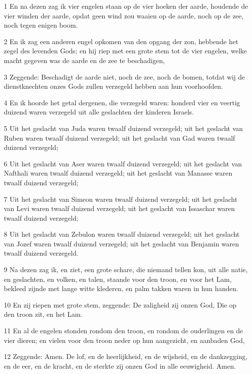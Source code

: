 \par 1 En na dezen zag ik vier engelen staan op de vier hoeken der aarde, houdende de vier winden der aarde, opdat geen wind zou waaien op de aarde, noch op de zee, noch tegen enigen boom.
\par 2 En ik zag een anderen engel opkomen van den opgang der zon, hebbende het zegel des levenden Gods; en hij riep met een grote stem tot de vier engelen, welke macht gegeven was de aarde en de zee te beschadigen,
\par 3 Zeggende: Beschadigt de aarde niet, noch de zee, noch de bomen, totdat wij de dienstknechten onzes Gods zullen verzegeld hebben aan hun voorhoofden.
\par 4 En ik hoorde het getal dergenen, die verzegeld waren: honderd vier en veertig duizend waren verzegeld uit alle geslachten der kinderen Israels.
\par 5 Uit het geslacht van Juda waren twaalf duizend verzegeld; uit het geslacht van Ruben waren twaalf duizend verzegeld; uit het geslacht van Gad waren twaalf duizend verzegeld;
\par 6 Uit het geslacht van Aser waren twaalf duizend verzegeld; uit het geslacht van Nafthali waren twaalf duizend verzegeld; uit het geslacht van Manasse waren twaalf duizend verzegeld;
\par 7 Uit het geslacht van Simeon waren twaalf duizend verzegeld; uit het geslacht van Levi waren twaalf duizend verzegeld; uit het geslacht van Issaschar waren twaalf duizend verzegeld;
\par 8 Uit het geslacht van Zebulon waren twaalf duizend verzegeld; uit het geslacht van Jozef waren twaalf duizend verzegeld; uit het geslacht van Benjamin waren twaalf duizend verzegeld.
\par 9 Na dezen zag ik, en ziet, een grote schare, die niemand tellen kon, uit alle natie, en geslachten, en volken, en talen, staande voor den troon, en voor het Lam, bekleed zijnde met lange witte klederen, en palm takken waren in hun handen.
\par 10 En zij riepen met grote stem, zeggende: De zaligheid zij onzen God, Die op den troon zit, en het Lam.
\par 11 En al de engelen stonden rondom den troon, en rondom de ouderlingen en de vier dieren; en vielen voor den troon neder op hun aangezicht, en aanbaden God,
\par 12 Zeggende: Amen. De lof, en de heerlijkheid, en de wijsheid, en de dankzegging, en de eer, en de kracht, en de sterkte zij onzen God in alle eeuwigheid. Amen.
